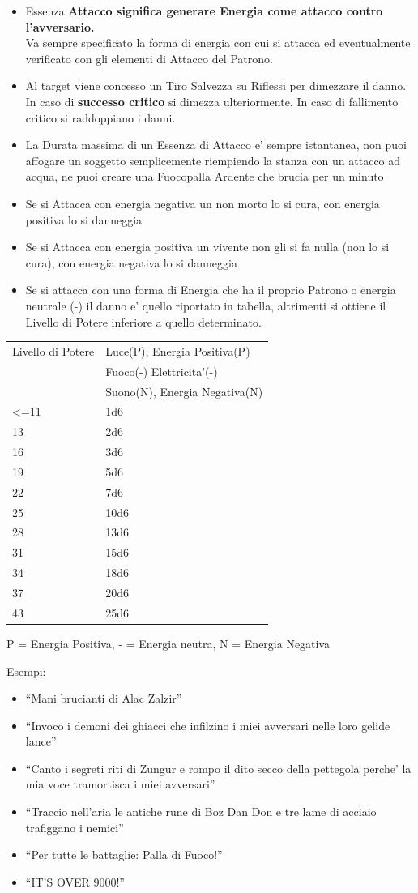\documentclass[a4paper,11pt,twoside,openany]{dndbook}
\begin{document}
\label{essenza-attacco---intelletto}
\begin{itemize}
\item 
Essenza \textbf{Attacco significa generare Energia come attacco contro
l'avversario.}\\
\textbf{}Va sempre specificato la forma di energia con cui si attacca
ed eventualmente verificato con gli elementi di Attacco del Patrono. 
\item 
Al target viene concesso un Tiro Salvezza su Riflessi per dimezzare
il danno. In caso di \textbf{successo critico} si dimezza ulteriormente. In
caso di fallimento critico si raddoppiano i danni. 
\item 
La Durata massima di un Essenza di Attacco e' sempre istantanea, non
puoi affogare un soggetto semplicemente riempiendo la stanza con un
attacco ad acqua, ne puoi creare una Fuocopalla Ardente che brucia
per un minuto 
\item 
Se si Attacca con energia negativa un non morto lo si cura, con energia
positiva lo si danneggia 
\item 
Se si Attacca con energia positiva un vivente non gli si fa nulla
(non lo si cura), con energia negativa lo si danneggia 
\item 
Se si attacca con una forma di Energia che ha il proprio Patrono o
energia neutrale (-) il danno e' quello riportato in tabella, altrimenti
si ottiene il Livello di Potere inferiore a quello determinato. 
\end{itemize}

\bigskip

\begin{tabular}[c]{@{}ll@{}}
\toprule 
Livello di Potere & Luce(P), Energia Positiva(P)\\
&Fuoco(-) Elettricita'(-) \\
&Suono(N), Energia Negativa(N)\tabularnewline
<=11 & 1d6\tabularnewline
13 & 2d6\tabularnewline
16 & 3d6\tabularnewline
19 & 5d6\tabularnewline
22 & 7d6\tabularnewline
25 & 10d6\tabularnewline
28 & 13d6\tabularnewline
31 & 15d6\tabularnewline
34 & 18d6\tabularnewline
37 & 20d6\tabularnewline
43 & 25d6\tabularnewline
\bottomrule
\end{tabular}

P = Energia Positiva, - = Energia neutra, N = Energia Negativa
\bigskip

Esempi:
\begin{itemize}
\item 
``Mani brucianti di Alac Zalzir'' 
\item 
``Invoco i demoni dei ghiacci che infilzino i miei avversari nelle loro gelide lance'' 
\item 
``Canto i segreti riti di Zungur e rompo il dito secco della pettegola perche' la mia voce tramortisca i miei avversari'' 
\item 
``Traccio nell'aria le antiche rune di Boz Dan Don e tre lame di acciaio trafiggano i nemici'' 
\item 
``Per tutte le battaglie: Palla di Fuoco!'' 
\item 
``IT'S OVER 9000!'' 
\end{itemize}
\bigskip
\end{document}
